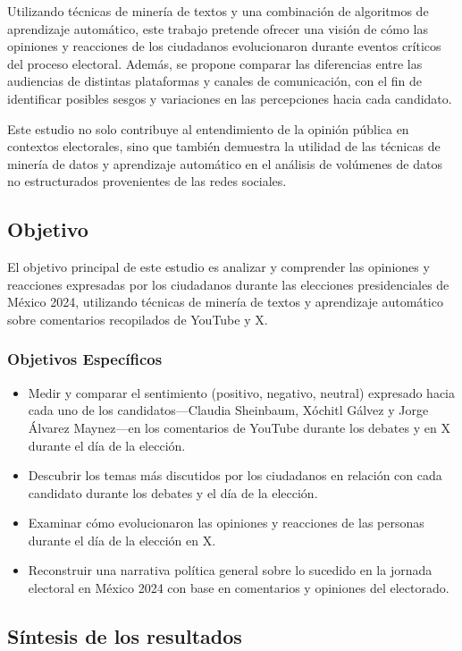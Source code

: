 \documentclass[10pt, a4paper]{article}
\begin{document}
	Utilizando técnicas de minería de textos y una combinación de algoritmos de aprendizaje automático, este trabajo pretende ofrecer una visión de cómo las opiniones y reacciones de los ciudadanos evolucionaron durante eventos críticos del proceso electoral. Además, se propone comparar las diferencias entre las audiencias de distintas plataformas y canales de comunicación, con el fin de identificar posibles sesgos y variaciones en las percepciones hacia cada candidato.
	
	Este estudio no solo contribuye al entendimiento de la opinión pública en contextos electorales, sino que también demuestra la utilidad de las técnicas de minería de datos y aprendizaje automático en el análisis de volúmenes de datos no estructurados provenientes de las redes sociales.
	
	\subsection{Objetivo}
	El objetivo principal de este estudio es analizar y comprender las opiniones y reacciones expresadas por los ciudadanos durante las elecciones presidenciales de México 2024, utilizando técnicas de minería de textos y aprendizaje automático sobre comentarios recopilados de YouTube y X. 
	
	\subsubsection{Objetivos Específicos}
	\begin{itemize}
		\item Medir y comparar el sentimiento (positivo, negativo, neutral) expresado hacia cada uno de los candidatos—Claudia Sheinbaum, Xóchitl Gálvez y Jorge Álvarez Maynez—en los comentarios de YouTube durante los debates y en X durante el día de la elección.
		\item  Descubrir los temas más discutidos por los ciudadanos en relación con cada candidato durante los debates y el día de la elección.
		\item Examinar cómo evolucionaron las opiniones y reacciones de las personas durante el día de la elección en X.
		\item Reconstruir una narrativa política general sobre lo sucedido en la jornada electoral en México 2024 con base en comentarios y opiniones del electorado. 
	\end{itemize}
	
	\subsection{Síntesis de los resultados}
	
\end{document}
